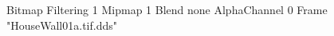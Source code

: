 {Bitmap
	{Filtering 1}
	{Mipmap 1}
	{Blend none}
	{AlphaChannel 0}
	{Frame "HouseWall01a.tif.dds"}
}
